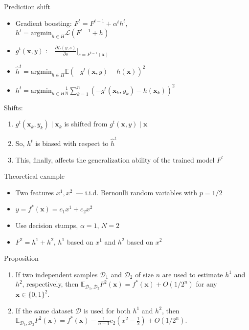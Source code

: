 \documentclass[pdf, 12pt, unicode]{beamer}
\newcommand{\x}{\mathbf{x}}
\newcommand{\D}{\mathcal{D}}
\newcommand{\E}{\mathbb{E}}
\newcommand{\1}{\mathbbm{1}}
\begin{document}
\begin{frame}{Prediction shift}

\begin{itemize}
	\item Gradient boosting: $F^{t}=F^{t-1}+ \alpha^t h^{t}$,\\ 
	$h^t = \mathrm{argmin}_{h\in H} \mathcal{L}(F^{t-1}+h)$ \,\,\, 
	\pause  
	\item $g^t(\x,y):=\frac{\partial L(y,s)}{\partial s}\big|_{s=F^{t-1}(\x)}$
	\item $\hat h^t = \mathrm{argmin}_{h\in H} \E\left (-g^t(\x,y)- h(\x)\right )^2$ 
	\pause
	\item $ h^t = \mathrm{argmin}_{h\in H} \frac{1}{n}\sum_{k=1}^{n} \left (-g^t(\x_k, y_k) -  h(\x_k)\right )^2$
\end{itemize}

\pause

Shifts:
\begin{enumerate}
	\item $g^t(\x_k, y_k)\mid \x_k$ is shifted from $g^t(\x, y)\mid \x$
	\item So, $h^t$ is biased with respect to $\hat h^t$
	\item This, finally, affects the generalization ability of the trained model $F^t$
\end{enumerate}

\end{frame}

\begin{frame}{Theoretical example}
	
\begin{itemize}
\item Two features $x^1, x^2$~--- i.i.d. Bernoulli random variables with $p = 1/2$
\item $y=f^*(\x)=c_1x^1+c_2x^2$
\item Use decision stumps, $\alpha = 1$, $N=2$
\item $F^2=h^1+h^2$, $h^1$ based on $x^1$ and $h^2$ based on $x^2$ 
\end{itemize}

\pause

\begin{block}{Proposition}
	\begin{enumerate}
		\item If two independent samples $\D_1$ and $\D_2$ of size $n$ are used to estimate $h^1$ and $h^2$, respectively, then
		$\E_{\D_1, \D_2} F^2(\x)=f^*(\x)+O(1/2^{n})$ for any $\x\in \{0,1\}^2$.
		\item If the same dataset $\D$ is used for both $h^1$ and $h^2$, then $\E_{\D_1, \D_2} F^2(\x)=f^*(\x)-\frac{1}{n-1}c_2(x^2-\frac{1}{2})+O(1/2^{n})$.
	\end{enumerate}
\end{block}


\end{frame}
\end{document}
